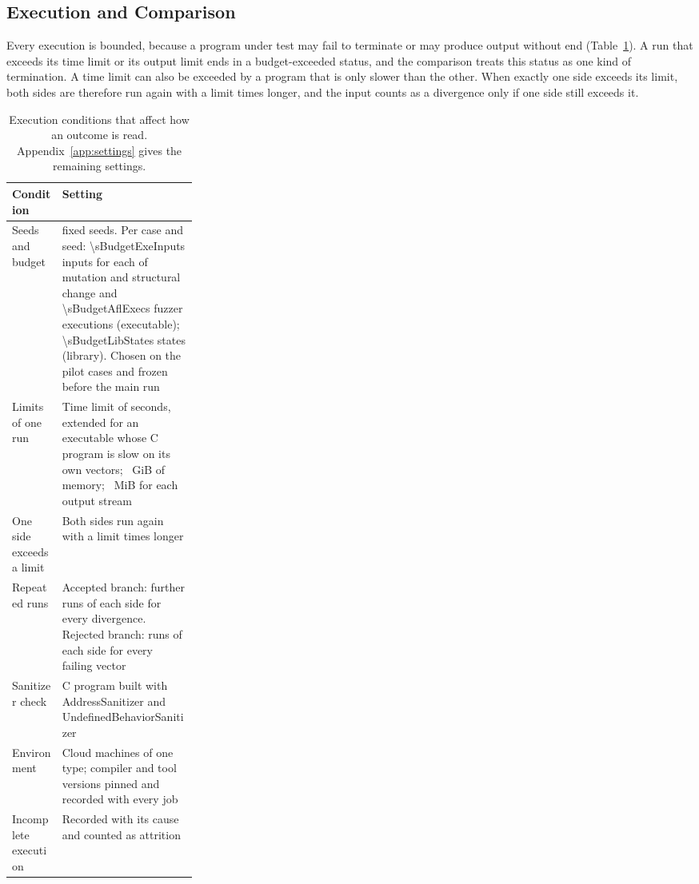 \subsection{Execution and Comparison}\label{sec:m-comparison}

Every execution is bounded, because a program under test may fail to terminate or may produce output without end (Table~\ref{tab:m-conditions}). A run that exceeds its time limit or its output limit ends in a budget-exceeded status, and the comparison treats this status as one kind of termination. A time limit can also be exceeded by a program that is only slower than the other. When exactly one side exceeds its limit, both sides are therefore run again with a limit \pRerunFactor{} times longer, and the input counts as a divergence only if one side still exceeds it.

\begin{table}[!htb]
\centering
\small
\caption{Execution conditions that affect how an outcome is read. Appendix~\ref{app:settings} gives the remaining settings.}
\label{tab:m-conditions}
\begin{tabularx}{\linewidth}{@{}p{0.27\linewidth}X@{}}
\toprule
Condition & Setting \\
\midrule
Seeds and budget & \pSeeds{} fixed seeds. Per case and seed: \num{\sBudgetExeInputs} inputs for each of mutation and structural change and \num{\sBudgetAflExecs} fuzzer executions (executable); \num{\sBudgetLibStates} states (library). Chosen on the pilot cases and frozen before the main run \\
Limits of one run & Time limit of \pTimeoutSec{} seconds, extended for an executable whose C program is slow on its own vectors; \pMemLimitGiB{}~GiB of memory; \pOutputCapMiB{}~MiB for each output stream \\
One side exceeds a limit & Both sides run again with a limit \pRerunFactor{} times longer \\
Repeated runs & Accepted branch: \pStabReps{} further runs of each side for every divergence. Rejected branch: \pRqTwoReps{} runs of each side for every failing vector \\
Sanitizer check & C program built with AddressSanitizer and UndefinedBehaviorSanitizer \\
Environment & Cloud machines of one type; compiler and tool versions pinned and recorded with every job \\
Incomplete execution & Recorded with its cause and counted as attrition \\
\bottomrule
\end{tabularx}
\end{table}

